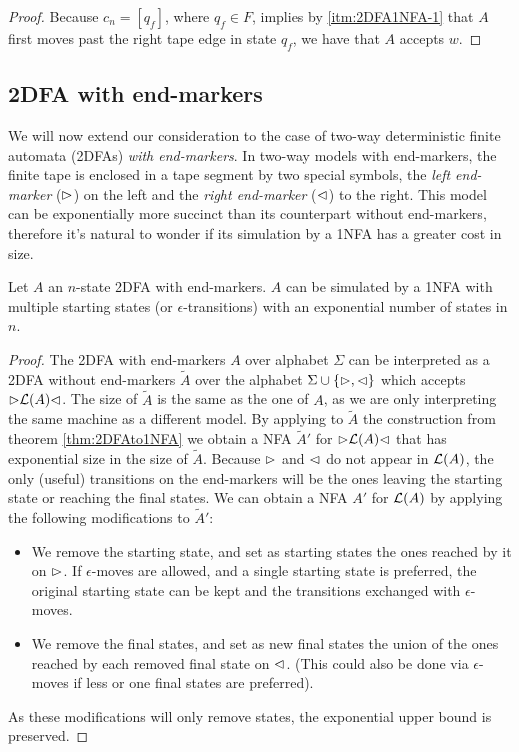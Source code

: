 \begin{proof}
	Because $c_n=[q_f]$, where $q_f\in F$, implies by \ref{itm:2DFA1NFA-1} that $A$ first moves past the right tape edge in state $q_f$, we have that $A$ accepts $w$.
\end{proof}


\subsection{2DFA with end-markers}
We will now extend our consideration to the case of two-way deterministic finite automata (2DFAs) \emph{with end-markers}.
In two-way models with end-markers, the finite tape is enclosed in a tape segment by two special symbols, the \emph{left end-marker} ($\rhd$) on the left and the \emph{right end-marker} ($\lhd$) to the right.
This model can be exponentially more succinct than its counterpart without end-markers, therefore it's natural to wonder if its simulation by a 1NFA has a greater cost in size.

\begin{thrm}
	Let $A$ an $n$-state 2DFA with end-markers. $A$ can be simulated by a 1NFA with multiple starting states (or $\epsilon$-transitions) with an exponential number of states in $n$.
\end{thrm}
\begin{proof}
	The 2DFA with end-markers $A$ over alphabet $\Sigma$ can be interpreted as a 2DFA without end-markers $\tilde A$ over the alphabet $\Sigma\cup\{\rhd,\lhd\}$ which accepts $\rhd\mathcal L(A)\lhd$.
	The size of $\tilde A$ is the same as the one of $A$, as we are only interpreting the same machine as a different model.
	By applying to $\tilde A$ the construction from theorem \ref{thm:2DFAto1NFA} we obtain a NFA $\tilde A'$ for $\rhd\mathcal L(A)\lhd$ that has exponential size in the size of $\tilde A$.
	Because $\rhd$ and $\lhd$ do not appear in $\mathcal L(A)$, the only (useful) transitions on the end-markers will be the ones leaving the starting state or reaching the final states.
	We can obtain a NFA $A'$ for $\mathcal L(A)$ by applying the following modifications to $\tilde A'$:
	\begin{itemize}
		\item We remove the starting state, and set as starting states the ones reached by it on $\rhd$. If $\epsilon$-moves are allowed, and a single starting state is preferred, the original starting state can be kept and the transitions exchanged with $\epsilon$-moves.
		\item We remove the final states, and set as new final states the union of the ones reached by each removed final state on $\lhd$. (This could also be done via $\epsilon$-moves if less or one final states are preferred).
	\end{itemize}

	As these modifications will only remove states, the exponential upper bound is preserved.
\end{proof}


